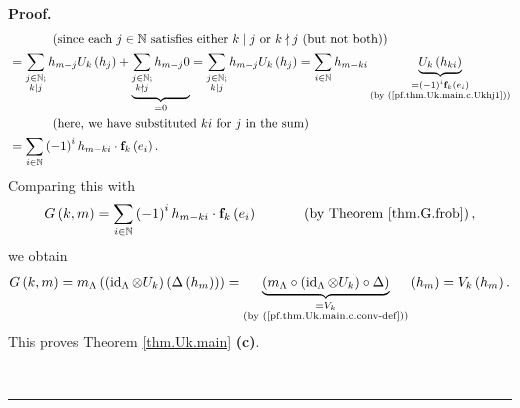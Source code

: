 \documentclass[numbers=enddot,12pt,final,onecolumn,notitlepage]{scrartcl}%
\theoremstyle{definition}
\newenvironment{proof}[1][Proof]{\noindent\textbf{#1.} }{\ \rule{0.5em}{0.5em}}
\let\sumnonlimits\sum
\renewcommand{\sum}{\sumnonlimits\limits}
\newenvironment{vershort}{}{}
\begin{document}
\begin{proof}
\begin{vershort}
\begin{align*}
&  \ \ \ \ \ \ \ \ \ \ \left(  \text{since each }j\in\mathbb{N}\text{
satisfies either }k\mid j\text{ or }k\nmid j\text{ (but not both)}\right) \\
&  =\sum_{\substack{j\in\mathbb{N};\\k\mid j}}h_{m-j}U_{k}\left(
h_{j}\right)  +\underbrace{\sum_{\substack{j\in\mathbb{N};\\k\nmid j}%
}h_{m-j}0}_{=0}=\sum_{\substack{j\in\mathbb{N};\\k\mid j}}h_{m-j}U_{k}\left(
h_{j}\right)  =\sum_{i\in\mathbb{N}}h_{m-ki}\underbrace{U_{k}\left(
h_{ki}\right)  }_{\substack{=\left(  -1\right)  ^{i}\mathbf{f}_{k}\left(
e_{i}\right)  \\\text{(by (\ref{pf.thm.Uk.main.c.Ukhj1}))}}}\\
&  \ \ \ \ \ \ \ \ \ \ \left(  \text{here, we have substituted }ki\text{ for
}j\text{ in the sum}\right) \\
&  =\sum_{i\in\mathbb{N}}\left(  -1\right)  ^{i}h_{m-ki}\cdot\mathbf{f}%
_{k}\left(  e_{i}\right)  .
\end{align*}
Comparing this with%
\[
G\left(  k,m\right)  =\sum_{i\in\mathbb{N}}\left(  -1\right)  ^{i}%
h_{m-ki}\cdot\mathbf{f}_{k}\left(  e_{i}\right)  \ \ \ \ \ \ \ \ \ \ \left(
\text{by Theorem \ref{thm.G.frob}}\right)  ,
\]
we obtain%
\[
G\left(  k,m\right)  =m_{\Lambda}\left(  \left(  \operatorname*{id}%
\nolimits_{\Lambda}\otimes U_{k}\right)  \left(  \Delta\left(  h_{m}\right)
\right)  \right)  =\underbrace{\left(  m_{\Lambda}\circ\left(
\operatorname*{id}\nolimits_{\Lambda}\otimes U_{k}\right)  \circ\Delta\right)
}_{\substack{=V_{k}\\\text{(by (\ref{pf.thm.Uk.main.c.conv-def}))}}}\left(
h_{m}\right)  =V_{k}\left(  h_{m}\right)  .
\]
This proves Theorem \ref{thm.Uk.main} \textbf{(c)}.
\end{vershort}


\end{proof}
\end{document}
